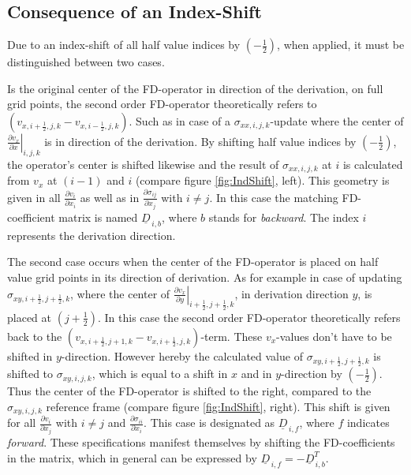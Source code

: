 \documentclass[pdftex,a4paper,parskip,listof=totoc,bibliography=totoc,onehalfspacing,12pt]{scrreprt}
\begin{document}
\subsection{Consequence of an Index-Shift}

Due to an index-shift of all half value indices by $(-\frac{1}{2})$, when applied, it must be distinguished between two cases. 

Is the original center of the FD-operator in direction of the derivation, on full grid points, the second order FD-operator theoretically refers to $\left(v_{x,i+\frac{1}{2},j,k} - v_{x,i-\frac{1}{2},j,k}\right)$. Such as in case of a $\sigma_{xx,i,j,k}$-update where the center of $\left. \frac{\partial v_x}{\partial x} \right\rvert_{i,j,k}$ is in direction of the derivation. By shifting half value indices by $(-\frac{1}{2})$, the operator's center is shifted likewise and the result of $\sigma_{xx,i,j,k}$ at $i$ is calculated from $v_x$ at $(i-1)$ and $i$ (compare figure \ref{fig:IndShift}, left). This geometry is given in all $\frac{\partial v_i}{\partial x_i}$ as well as in $\frac{\partial \sigma_{ij}}{\partial x_j}$ with $i\neq j$. In this case the matching FD-coefficient matrix  is named $\underline{D}_{\,i,b}$, where $b$ stands for \textit{backward}. The index $i$ represents the derivation direction.

The second case occurs when the center of the FD-operator is placed on half value grid points in its direction of derivation. As for example in case of  updating $\sigma_{xy,i+\frac{1}{2},j+\frac{1}{2},k}$, where the center of $\left. \frac{\partial v_x}{\partial y} \right\rvert_{i+\frac{1}{2},j+\frac{1}{2},k}$, in derivation direction $y$, is placed at $(j+\frac{1}{2})$. In this case the second order FD-operator theoretically refers back to the $\left(v_{x,i+\frac{1}{2},j+1,k} - v_{x,i+\frac{1}{2},j,k}\right)$-term. These $v_x$-values don't have to be shifted in $y$-direction. However hereby the calculated value of $\sigma_{xy,i+\frac{1}{2},j+\frac{1}{2},k}$ is shifted to $\sigma_{xy,i,j,k}$, which is equal to a shift in $x$ and in $y$-direction by $(-\frac{1}{2})$. Thus the center of the FD-operator is shifted to the right, compared to the $\sigma_{xy,i,j,k}$ reference frame (compare figure \ref{fig:IndShift}, right). This shift is given for all $\frac{\partial v_i}{\partial x_j}$ with $i\neq j$ and $\frac{\partial \sigma_{ii}}{\partial x_i}$. This case is designated as $\underline{D}_{\,i,f}$, where $f$ indicates \textit{forward}.
These specifications manifest themselves by shifting the FD-coefficients in the matrix, which in general can be expressed by $\underline{D}_{\,i,f} = -\underline{D}_{\,i,b}^T$.
\end{document}
